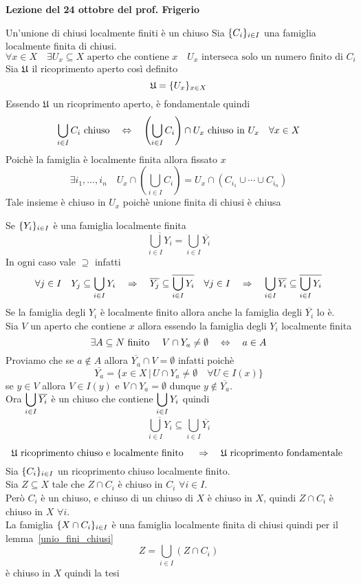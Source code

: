 


\textbf{Lezione del 24 ottobre del prof. Frigerio}
\begin{lem}\label{unio_fini_chiusi}Un'unione di chiusi localmente finiti \`e un chiuso
\proof Sia $\displaystyle \{ C_i \}_{i\in I}$ una famiglia localmente finita di chiusi.
$$ \forall x \in X  \quad \exists U_x \subseteq X \text{ aperto che contiene } x \quad U_x \text{ interseca solo un numero finito di } C_i$$
Sia $\mathfrak{U}$ il ricoprimento aperto cos\`i definito
$$ \mathfrak{U} =\{ U_x \}_{x\in X }$$
Essendo $\mathfrak{U}$ un ricoprimento aperto, \`e fondamentale quindi 
$$ \bigcup_{i \in I } C_i \text{ chiuso} \quad \Leftrightarrow \quad \left(  \bigcup_{i\in I } C_i\right) \cap U_x \text{ chiuso in } U_x \quad \forall x \in X$$
Poich\`e la famiglia \`e localmente finita allora fissato $x$
$$ \exists i_1, \dots, i_n \quad U_x \cap \left( \bigcup_{i\in I } C_i \right) = U_x \cap \left( C_{i_1} \cup \cdots \cup C_{i_n} \right)$$
Tale insieme \`e chiuso in $U_x$ poich\`e unione finita di chiusi \`e chiusa
\endproof
\end{lem}
\begin{cor}Se $\displaystyle \{Y_i\}_{i \in I }$ \`e una famiglia localmente finita
$$ \overline{\bigcup_{i\in I } Y_i }= \bigcup_{i \in I } \overline{Y_i} $$
\proof In ogni caso vale $\supseteq $ infatti
$$ \forall j \in I \quad Y_j \subseteq \bigcup_{i \in I } Y_i \quad \Rightarrow \quad \overline{Y_j} \subseteq \overline{\bigcup_{i \in I } Y_i} \quad \forall j \in I \quad   \Rightarrow \quad \bigcup_{i \in I } \overline{Y_i} \subseteq \overline{\bigcup_{i\in I } Y_i}$$
Se la famiglia degli $Y_i$ \`e localmente finito allora anche la famiglia degli $\overline{Y_i}$ lo \`e.\\
Sia $V$ un aperto che contiene $x$ allora essendo la famiglia degli $Y_i$ localmente finita
$$ \exists A\subseteq N \text{ finito } \quad V \cap Y_a \neq \emptyset \quad \Leftrightarrow \quad a \in A$$
Proviamo che se $a\not \in A $ allora  $\overline{Y_a}\cap V = \emptyset$ infatti poich\`e
$$ \overline{Y_a} = \{ x \in X \, \vert \, U \cap Y_a \neq \emptyset \quad \forall U \in I(x) \}$$
se $y \in V$ allora $V\in I(y)$ e $V\cap Y_a = \emptyset$ dunque $y \not \in \overline{Y_a}$.\\
Ora $\displaystyle \bigcup_{i \in I } \overline{Y_i}$ \`e un chiuso che contiene $\displaystyle \bigcup_{i \in I } Y_i$ quindi 
$$ \overline{\bigcup_{i \in I } Y_i} \subseteq \bigcup_{i \in I } \overline{Y_i}$$
\endproof
\end{cor}
\begin{thm}
$$ \mathfrak{U} \text{ ricoprimento chiuso e localmente finito } \quad \Rightarrow \quad \mathfrak{U} \text{ ricoprimento fondamentale }$$
\proof Sia $\displaystyle \{ C_i \}_{i \in I } $ un ricoprimento chiuso localmente finito.\\
Sia $Z\subseteq X$ tale che $Z \cap C_i$ \`e chiuso in $C_i$ $\forall i \in I$.\\
Per\`o $C_i$ \`e un chiuso, e chiuso di un chiuso di $X$ \`e chiuso in $X$, quindi $Z \cap C_i $ \`e chiuso in $X$ $\forall i$.\\
La famiglia $\displaystyle \{ X \cap C_i\}_{i \in I } $ \`e una famiglia localmente finita di chiusi quindi per il lemma~\ref{unio_fini_chiusi} 
$$ Z = \bigcup_{i \in I } ( Z \cap C_i ) $$
\`e chiuso in $X$ quindi la tesi
\endproof
\end{thm}
\newpage

